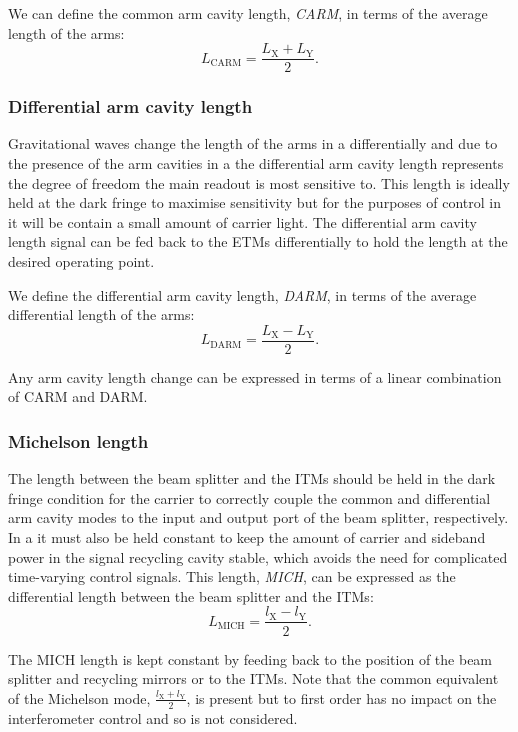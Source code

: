 We can define the common arm cavity length, \emph{\gls{CARM}}, in terms of the average length of the arms:
\begin{equation}
  L_{\text{CARM}} = \frac{L_{\text{X}} + L_{\text{Y}}}{2}.
\end{equation}

\subsubsection{Differential arm cavity length}
Gravitational waves change the length of the arms in a \MI{} differentially and due to the presence of the arm cavities in a \DRFPMI{} the differential arm cavity length represents the degree of freedom the main readout is most sensitive to. This length is ideally held at the dark fringe to maximise sensitivity but for the purposes of control in \ETLF{} it will be contain a small amount of carrier light. The differential arm cavity length signal can be fed back to the \glspl{ETM} differentially to hold the length at the desired operating point.

We define the differential arm cavity length, \emph{\gls{DARM}}, in terms of the average differential length of the arms:
\begin{equation}
  L_{\text{DARM}} = \frac{L_{\text{X}} - L_{\text{Y}}}{2}.
\end{equation}

Any arm cavity length change can be expressed in terms of a linear combination of \gls{CARM} and \gls{DARM}.

\subsubsection{Michelson length}
The length between the beam splitter and the \glspl{ITM} should be held in the dark fringe condition for the carrier to correctly couple the common and differential arm cavity modes to the input and output port of the beam splitter, respectively. In a \DRFPMI{} it must also be held constant to keep the amount of carrier and sideband power in the signal recycling cavity stable, which avoids the need for complicated time-varying control signals. This length, \emph{\gls{MICH}}, can be expressed as the differential length between the beam splitter and the \glspl{ITM}:
\begin{equation}
  L_{\text{MICH}} = \frac{l_{\text{X}} - l_{\text{Y}}}{2}.
\end{equation}

The \gls{MICH} length is kept constant by feeding back to the position of the beam splitter and recycling mirrors or to the \glspl{ITM}. Note that the common equivalent of the Michelson mode, $\frac{l_{\text{X}} + l_{\text{Y}}}{2}$, is present but to first order has no impact on the interferometer control and so is not considered.


